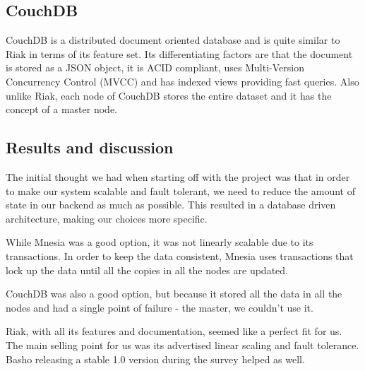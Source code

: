 \documentclass[11pt,a4paper]{report}
\begin{document}
\subsection{CouchDB}
CouchDB is a distributed document oriented database and is quite similar to Riak
in terms of its feature set. Its differentiating factors are that the document
is stored as a JSON object, it is ACID compliant, uses Multi-Version Concurrency
Control (MVCC) and has indexed views providing fast queries. Also unlike Riak,
each node of CouchDB stores the entire dataset and it has the concept of a
master node.

\subsection{Results and discussion}
The initial thought we had when starting off with the project was that in order
to make our system scalable and fault tolerant, we need to reduce the amount of
state in our backend as much as possible. This resulted in a database driven
architecture, making our choices more specific.

While Mnesia was a good option, it was not linearly scalable due to its
transactions. In order to keep the data consistent, Mnesia uses transactions
that lock up the data until all the copies in all the nodes are updated.

CouchDB was also a good option, but because it stored all the data in all the
nodes and had a single point of failure - the master, we couldn't use it.

Riak, with all its features and documentation, seemed like a perfect fit for
us. The main selling point for us was its advertised linear scaling and fault
tolerance. Basho releasing a stable 1.0 version during the survey helped as
well.

\renewcommand\bibname{References}


\end{document}

